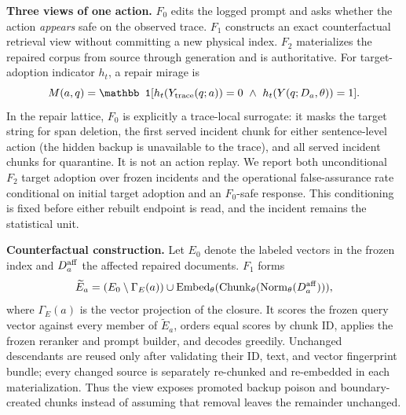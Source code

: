 \documentclass{article}
\newcommand{\fzero}{\ensuremath{F_0}}
\newcommand{\fone}{\ensuremath{F_1}}
\newcommand{\ftwo}{\ensuremath{F_2}}
\begin{document}
\textbf{Three views of one action.} \fzero{} edits the logged prompt and asks
whether the action \emph{appears} safe on the observed trace. \fone{} constructs
an exact counterfactual retrieval view without committing a new physical
index. \ftwo{} materializes the repaired corpus from source through generation
and is authoritative. For target-adoption indicator $h_t$, a repair mirage is
\begin{equation}
 M(a,q)=\mathbb 1[h_t(Y_{\rm trace}(q;a))=0\ \land\
 h_t(Y(q;D_a,\theta))=1].
\end{equation}
In the repair lattice, \fzero{} is explicitly a trace-local surrogate: it masks
the target string for span deletion, the first served incident chunk for either
sentence-level action (the hidden backup is unavailable to the trace), and all
served incident chunks for quarantine. It is not an action replay.
We report both unconditional \ftwo{} target adoption over frozen incidents and
the operational false-assurance rate conditional on initial target adoption and an
\fzero{}-safe response. This conditioning is fixed before either rebuilt
endpoint is read, and the incident remains the statistical unit.

\textbf{Counterfactual construction.} Let $E_0$ denote the labeled vectors in
the frozen index and $D_a^{\rm aff}$ the affected repaired documents. \fone{}
forms
\begin{equation}
 \widetilde E_a=(E_0\setminus\Gamma_E(a))\cup
 \operatorname{Embed}_\theta(\operatorname{Chunk}_\theta(
 \operatorname{Norm}_\theta(D_a^{\rm aff}))),
\end{equation}
where $\Gamma_E(a)$ is the vector projection of the closure. It scores the
frozen query vector against every member of $\widetilde E_a$, orders equal
scores by chunk ID, applies the frozen reranker and prompt builder, and decodes
greedily. Unchanged descendants are reused only after validating their ID,
text, and vector fingerprint bundle; every changed source is separately
re-chunked and re-embedded in each materialization. Thus the view exposes promoted backup poison and boundary-created
chunks instead of assuming that removal leaves the remainder unchanged.
\end{document}
